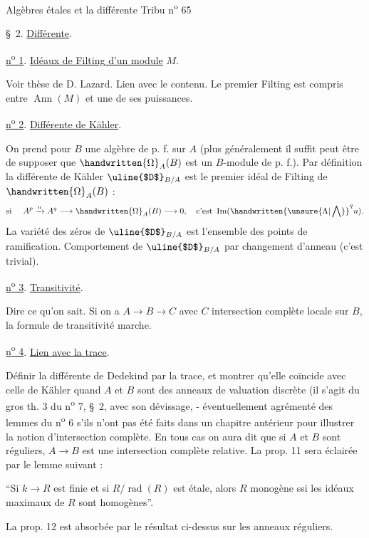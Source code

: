 Algèbres étales et la différente \hfill Tribu n\textsuperscript{o} 65

\S~2. \uline{Différente}.

\uline{n\textsuperscript{o} 1}. \uline{Idéaux de Filting d'un module} $M$.

Voir thèse de D. Lazard. Lien avec le contenu. Le premier Filting est compris entre
$\operatorname{Ann}(M)$ et une de ses puissances.

\uline{n\textsuperscript{o} 2}. \uline{Différente de Kähler}.

On prend pour $B$ une algèbre de p. f. sur $A$ (plus généralement il suffit peut
être de supposer que $\handwritten{\Omega}_{A}(B)$ est un $B$-module de p. f.). Par définition la différente
de Kähler $\text{\uline{$D$}}_{B/A}$ est le premier idéal de Filting de $\handwritten{\Omega}_{A}(B)$ :
\[
\text{si }\quad A^{p}\xrightarrow{u}A^{q}\longrightarrow\handwritten{\Omega}_{A}(B)\longrightarrow 0,\quad \text{c'est }\operatorname{Im}(\handwritten{\unsure{\Lambda|\bigwedge}}^{q}u).
\]
La variété des zéros de $\text{\uline{$D$}}_{B/A}$ est l'ensemble des points de ramification. Comportement
de $\text{\uline{$D$}}_{B/A}$ par changement d'anneau (c'est trivial).

\uline{n\textsuperscript{o} 3}. \uline{Transitivité}.

Dire ce qu'on sait. Si on a $A\to B\to C$ avec $C$ intersection complète locale
sur $B$, la formule de transitivité marche.

\uline{n\textsuperscript{o} 4}. \uline{Lien avec la trace}.

Définir la différente de Dedekind par la trace, et montrer qu'elle coïncide avec
celle de Kähler quand $A$ et $B$ sont des anneaux de valuation discrète (il s'agit
du gros th. 3 du n\textsuperscript{o} 7, \S~2, avec son dévissage, - éventuellement agrémenté des lemmes
du n\textsuperscript{o} 6 s'ils n'ont pas été faits dans un chapitre antérieur pour illustrer la notion
d'intersection complète. En tous cas on aura dit que si $A$ et $B$ sont réguliers,
$A\longrightarrow B$ est une intersection complète relative. La prop. 11 sera éclairée par le lemme
suivant :

``Si $k\longrightarrow R$ est finie et si $R/\operatorname{rad}(R)$ est étale, alors $R$ monogène ssi les
idéaux maximaux de $R$ sont homogènes''.

La prop. 12 est absorbée par le résultat ci-dessus sur les anneaux réguliers.

